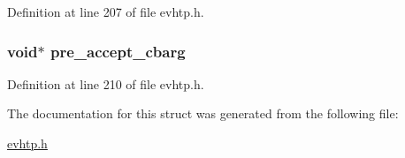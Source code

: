 Definition at line 207 of file evhtp.h.

\hypertarget{structevhtp__defaults__s_a0f92afb003b402ad524c0a95d13b4fb7}{
\subsubsection[{pre\_\-accept\_\-cbarg}]{\setlength{\rightskip}{0pt plus 5cm}void$\ast$ {\bf pre\_\-accept\_\-cbarg}}}
\label{structevhtp__defaults__s_a0f92afb003b402ad524c0a95d13b4fb7}


Definition at line 210 of file evhtp.h.



The documentation for this struct was generated from the following file:\begin{DoxyCompactItemize}
\item 
\hyperlink{evhtp_8h}{evhtp.h}\end{DoxyCompactItemize}
